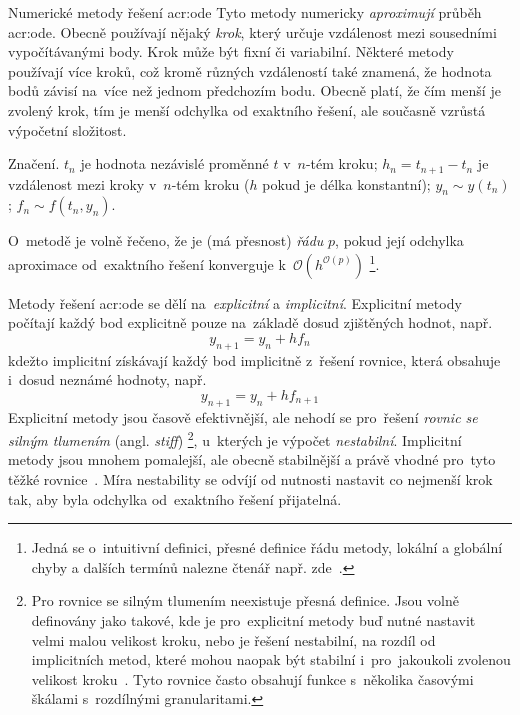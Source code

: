 \documentclass[thesis=M,czech]{FITthesis}[2012/06/26]
\newcommand{\acrlabel}[1]{acr:#1}
\newcommand{\acr}[1]{\acrshort{\acrlabel{#1}}}
\newcommand{\hl}[1]{\textit{#1}}
\newcommand{\name}[1]{\hl{#1}}
\newcommand{\cit}[1]{\cite{#1}}
\newcommand{\set}[1]{\ensuremath{\mathcal{#1}}}
\begin{document}
\begin{section}{Numerické metody řešení \acr{ode}}\label{s:search:ode}
Tyto metody numericky \hl{aproximují} průběh \acr{ode}.
Obecně používají nějaký \name{krok},
který určuje vzdálenost mezi sousedními vypočítávanými body.
Krok může být fixní či variabilní.
Některé metody používají více kroků,
což kromě různých vzdáleností také znamená,
že hodnota bodů závisí na~více než jednom předchozím bodu.
Obecně platí, že čím menší je zvolený krok,
tím je menší odchylka od exaktního řešení,
ale současně vzrůstá výpočetní složitost.


\begin{paragraph}{Značení.}\label{p:search:ode:sign}
$t_n$ je hodnota nezávislé proměnné $t$ v~$n$-tém kroku;
$h_n = {t_{n+1} - t_{n}}$ je vzdálenost mezi kroky v~$n$-tém kroku
($h$ pokud je délka konstantní);
${y_n \sim y(t_n)}$;
${f_n \sim f(t_n, y_n)}$.

O~metodě je volně řečeno, že je (má přesnost) \name{řádu} $p$,
pokud její odchylka aproximace od~exaktního řešení
konverguje k~${\set{O}( h^{\set{O}(p)} )}$\:%
\footnote{Jedná se o~intuitivní definici,
přesné definice řádu metody,
lokální a globální chyby a dalších termínů
nalezne čtenář např. zde~\cit{ode-nsolve-intro}.}.
\end{paragraph} %


\bigskip

Metody řešení \acr{ode} se dělí
na~\name{explicitní} a \name{implicitní}.
Explicitní metody počítají každý bod explicitně
pouze na~základě dosud zjištěných hodnot, např.
\begin{equation}\label{eq:ode:explicit}
   y_{n+1} = y_n + h f_n
\end{equation}
kdežto implicitní získávají každý bod implicitně z~řešení rovnice,
která obsahuje i~dosud neznámé hodnoty, např.
\begin{equation}\label{eq:ode:implicit}
   y_{n+1} = y_{n} + h f_{n+1}
\end{equation}
Explicitní metody jsou časově efektivnější,
ale nehodí se pro~řešení
\name{rovnic se silným tlumením} (angl. \name{stiff})%
\footnote{Pro rovnice se silným tlumením
neexistuje přesná definice.
Jsou volně definovány
jako takové, kde je pro~explicitní metody buď nutné nastavit
velmi malou velikost kroku,
nebo je řešení nestabilní,
na rozdíl od implicitních metod,
které mohou naopak být stabilní
i~pro~jakoukoli zvolenou
velikost kroku~\cit{ode-nsolve-intro}\cit{ode-nsolve}.
Tyto rovnice často obsahují funkce s~několika
časovými škálami s~rozdílnými granularitami.},
u~kterých je výpočet \hl{nestabilní}.
Implicitní metody jsou mnohem pomalejší, ale obecně stabilnější
a právě vhodné pro~tyto těžké rovnice~\cit{ode-nsolve-intro}.
Míra nestability se odvíjí od nutnosti nastavit co nejmenší krok tak,
aby byla odchylka od~exaktního řešení přijatelná.


\end{section}
\end{document}

